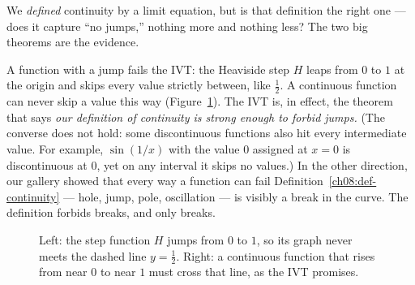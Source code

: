We \emph{defined} continuity by a limit equation, but is that
definition the right one --- does it capture ``no jumps,'' nothing more and nothing
less? The two big theorems are the evidence.

A function with a jump fails the IVT: the Heaviside step $H$ leaps from $0$ to $1$ at the
origin and skips every value strictly between, like $\tfrac12$. A continuous function can
never skip a value this way (Figure~\ref{ch08:fig-skip}). The IVT is, in effect, the theorem that says \emph{our
definition of continuity is strong enough to forbid jumps.} (The converse does not hold:
some discontinuous functions also hit every intermediate value. For example, $\sin(1/x)$
with the value $0$ assigned at $x=0$ is discontinuous at $0$, yet on any interval it skips
no values.) In the other direction, our gallery showed that every way
a function can fail Definition~\ref{ch08:def-continuity} --- hole, jump, pole, oscillation
--- is visibly a break in the curve. The definition forbids breaks, and only breaks.

\begin{figure}[htbp]
\centering
{}
\caption{Left: the step function $H$ jumps from $0$ to $1$, so its graph never meets the
dashed line $y=\tfrac12$. Right: a continuous function that rises from near $0$ to near
$1$ must cross that line, as the IVT promises.}
\label{ch08:fig-skip}
\end{figure}

